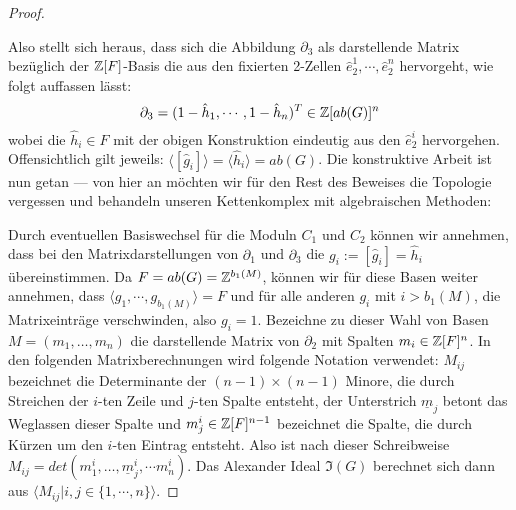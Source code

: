 \begin{proof}
\begin{center}

\end{center}


	Also stellt sich heraus, dass sich die Abbildung $\partial_3$ als darstellende Matrix bezüglich der $\mathbb{Z}[F]$-Basis die aus den fixierten 2-Zellen $\hat e_2^1,\cdots, \hat e_2^n$ hervorgeht, wie folgt auffassen lässt:
	\[
		\partial_3 = (1-\hat h_1,\cdots, 1-\hat h_n)^T \in \mathbb{Z}[ab(G)]^n
	\]
	wobei die $\hat h_i \in F$ mit der obigen Konstruktion eindeutig aus den $\hat e_2^i$ hervorgehen. Offensichtlich gilt jeweils: $\langle [\hat g_i] \rangle = \langle \hat h_i \rangle = ab(G)$. Die konstruktive Arbeit ist nun getan --- von hier an möchten wir für den Rest des Beweises die Topologie vergessen und behandeln unseren Kettenkomplex mit algebraischen Methoden:

	Durch eventuellen Basiswechsel für die Moduln $C_1$ und $C_2$ können wir annehmen, dass bei den Matrixdarstellungen von $\partial_1$ und $\partial_3$ die $g_i:=[\hat g_i]= \hat h_i$ übereinstimmen. Da $F=ab(G)=\mathbb{Z}^{b_1(M)}$, können wir für diese Basen weiter annehmen, dass $\langle g_1,\cdots,g_{b_1(M)}\rangle=F$ und für alle anderen $g_i$ mit $i> b_1(M)$, die Matrixeinträge verschwinden, also $g_i=1$. Bezeichne zu dieser Wahl von Basen $M= (m_1,\dots,m_n)$ die darstellende Matrix von $\partial_2$ mit Spalten $m_i\in \mathbb{Z}[F]^n$. In den folgenden Matrixberechnungen wird folgende Notation verwendet: $M_{ij}$ bezeichnet die Determinante der $(n-1)\times (n-1)$ Minore, die durch Streichen der $i$-ten Zeile und $j$-ten Spalte entsteht, der Unterstrich $\underline m_j$ betont das Weglassen dieser Spalte und $m_j^i\in \mathbb{Z}[F]^{n-1}$ bezeichnet die Spalte, die durch Kürzen um den $i$-ten Eintrag entsteht. Also ist nach dieser Schreibweise $M_{ij}=det(m^i_1, \dots , \underline m^i_j , \cdots m^i_n)$. Das Alexander Ideal $\mathfrak I(G)$ berechnet sich dann aus $\langle M_{ij}| i,j \in \{1,\cdots,n\} \rangle$.


\end{proof}
